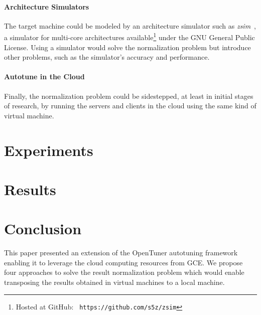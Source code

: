 \documentclass[a4paper, 12pt]{article}
\begin{document}
\paragraph{Architecture Simulators}
The target machine could be modeled by an architecture simulator such as
\emph{zsim}~\cite{sanchez2013zsim}, a simulator for multi-core architectures
available\footnote{Hosted at GitHub: \texttt{\scriptsize
https://github.com/s5z/zsim}} under the GNU General Public License.  Using a
simulator would solve the normalization problem but introduce other problems,
such as the simulator's accuracy and performance.

\paragraph{Autotune in the Cloud}
Finally, the normalization problem could be sidestepped, at least in initial
stages of research, by running the servers and clients in the cloud using
the same kind of virtual machine.

\section{Experiments} \label{sec:exp}


\section{Results} \label{sec:results}


\section{Conclusion} \label{sec:conclusion}

This paper presented an extension of the OpenTuner autotuning framework
enabling it to leverage the cloud computing resources from GCE.  We propose
four approaches to solve the result normalization problem which would enable
transposing the results obtained in virtual machines to a local machine.



\end{document}
